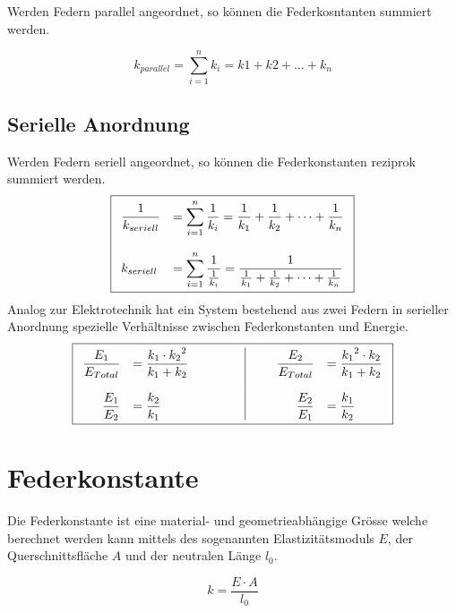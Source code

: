 \noindent
Werden Federn parallel angeordnet, so können die Federkosntanten summiert 
werden.

\[ \boxed{k_{parallel} = \sum_{i=1}^n k_i = k1 + k2 + \dots + k_n} \]

\subsection{Serielle Anordnung}

\noindent
Werden Federn seriell angeordnet, so können die Federkonstanten reziprok 
summiert werden.
\[ \boxed{\begin{array}{l l}\displaystyle
	\frac{1}{k_{seriell}} & = 
		\displaystyle \sum_{i=1}^n \frac{1}{k_i} = 
		\displaystyle \frac{1}{k_1} + \frac{1}{k_2} 
			+ \dots + \frac{1}{k_n} \\
	& \\
	k_{seriell} & = 
		\displaystyle \sum_{i=1}^n \frac{1}{\frac{1}{k_i}} = 
		\displaystyle \frac{1}{\frac{1}{k_1} + \frac{1}{k_2} 
			+ \dots + \frac{1}{k_n}}
\end{array}} \]
Analog zur Elektrotechnik hat ein System bestehend aus zwei Federn
in serieller Anordnung spezielle Verhältnisse zwischen Federkonstanten 
und Energie.
\[ \boxed{\begin{array}{r l | r l}
\displaystyle
\frac{E_1}{E_{Total}} & = 
\displaystyle \frac{k_1 \cdot {k_2}^2}{k_1 + k_2} 
	\qquad \qquad
	& \qquad \displaystyle \frac{E_2}{E_{Total}}
	& = \displaystyle \frac{{k_1}^2 \cdot k_2}{k_1 + k_2} \\
& & & \\
\displaystyle \frac{E_1}{E_2} & = 
\displaystyle \frac{k_2}{k_1} 
	\qquad \qquad
	& \qquad \displaystyle \frac{E_2}{E_1} & = 
	\displaystyle \frac{k_1}{k_2}
\end{array}} \]
\section{Federkonstante}
Die Federkonstante ist eine material- und geometrieabhängige Grösse welche
berechnet werden kann mittels des sogenannten Elastizitätsmoduls $E$, der
Querschnittsfläche $A$ und der neutralen Länge $l_0$.

\[ \boxed{k = \frac{E \cdot A}{l_0}} \]

